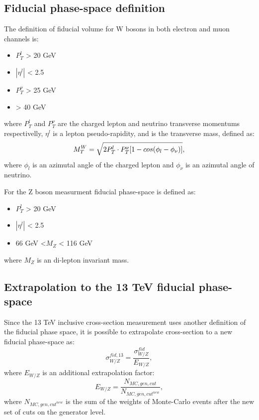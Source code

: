 \subsection{Fiducial phase-space definition}
The definition of fiducial volume for W bosons in both electron and muon channels is:
\begin{itemize}
\item $P_T^l$ > 20 GeV
\item $|\eta^l|$ < 2.5 
\item $P_T^{\nu}$ > 25 GeV
\item \mtw > 40 GeV
\end{itemize}
where $P_T^l$ and $P_T^{\nu}$ are the charged lepton and neutrino transverse momentums respectivelly, $\eta^l $ is a lepton pseudo-rapidity, and \mtw is the transverse mass, defined as:
\begin{equation}\label{Eq:mtW}
M_T^W = \sqrt{ 2 P_T^l \cdot P_T^{\nu} [ 1 - cos (\phi_l - \phi_{\nu})]},
\end{equation}
where $\phi_l$ is an azimutal angle of the charged lepton and $\phi_{\nu}$ is an azimutal angle of neutrino.

For the Z boson measurment fiducial phase-space is defined as:
\begin{itemize}
\item $P_T^l$ > 20 GeV
\item $|\eta^l|$ < 2.5 
\item 66 GeV <$M_{Z}$ < 116 GeV
\end{itemize}
where $M_{Z}$ is an di-lepton invariant mass.

\subsection{Extrapolation to the 13 TeV fiducial phase-space}

Since the  13 TeV inclusive cross-section measurement  uses another definition of the fiducial phase space, it is possible to extrapolate cross-section to a new fiducial phase-space as:
\begin{equation}
\sigma^{fid,13}_{W/Z} = \frac{\sigma^{fid}_{W/Z}}{E_{W/Z}},
\end{equation}
where $E_{W/Z}$ is an additional extrapolation factor:
\begin{equation}
E_{W/Z}=\frac{N_{MC,gen, cut}}{N_{MC,gen, cut^{new}}},
\end{equation}
where $N_{MC,gen, cut^{new}}$ is the sum of the weights of Monte-Carlo events after the new set of cuts on the generator level.

